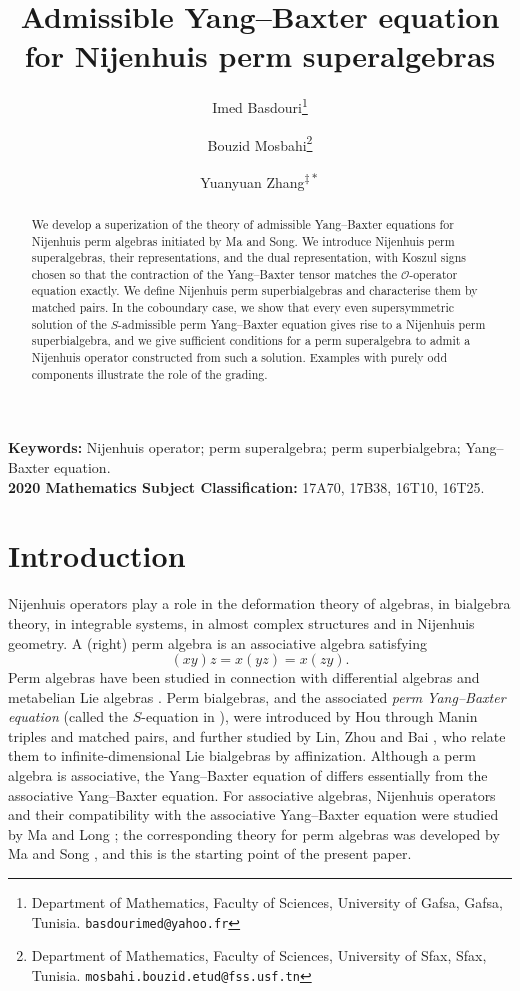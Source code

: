 \documentclass[11pt]{article}
\title{Admissible Yang--Baxter equation for Nijenhuis perm superalgebras}
\author{
Imed Basdouri\thanks{Department of Mathematics, Faculty of Sciences,
University of Gafsa, Gafsa, Tunisia.
\texttt{basdourimed@yahoo.fr}}
\and Bouzid Mosbahi\thanks{Department of Mathematics, Faculty of Sciences,
University of Sfax, Sfax, Tunisia.
\texttt{mosbahi.bouzid.etud@fss.usf.tn}}
\and Yuanyuan Zhang\textsuperscript{$\ddagger*$}
}
\date{}
\theoremstyle{definition}
\begin{document}
\maketitle

\begin{abstract}
We develop a superization of the theory of admissible Yang--Baxter equations for Nijenhuis perm algebras initiated by Ma and Song. We introduce Nijenhuis perm superalgebras, their representations, and the dual representation, with Koszul signs chosen so that the contraction of the Yang--Baxter tensor matches the $\mathcal O$-operator equation exactly. We define Nijenhuis perm superbialgebras and characterise them by matched pairs. In the coboundary case, we show that every even supersymmetric solution of the $S$-admissible perm Yang--Baxter equation gives rise to a Nijenhuis perm superbialgebra, and we give sufficient conditions for a perm superalgebra to admit a Nijenhuis operator constructed from such a solution. Examples with purely odd components illustrate the role of the grading.
\end{abstract}

\noindent\textbf{Keywords:} Nijenhuis operator; perm superalgebra; perm superbialgebra; Yang--Baxter equation.\\
\textbf{2020 Mathematics Subject Classification:} 17A70, 17B38, 16T10, 16T25.

\section{Introduction}

Nijenhuis operators play a role in the deformation theory of algebras, in bialgebra theory, in integrable systems, in almost complex structures and in Nijenhuis geometry. A (right) perm algebra is an associative algebra satisfying
\[
(xy)z=x(yz)=x(zy).
\]
Perm algebras have been studied in connection with differential algebras and metabelian Lie algebras \cite{KS,MaSa}. Perm bialgebras, and the associated \emph{perm Yang--Baxter equation} (called the $S$-equation in \cite{Hou}), were introduced by Hou \cite{Hou} through Manin triples and matched pairs, and further studied by Lin, Zhou and Bai \cite{LZB}, who relate them to infinite-dimensional Lie bialgebras by affinization. Although a perm algebra is associative, the Yang--Baxter equation of \cite{Hou,LZB} differs essentially from the associative Yang--Baxter equation. For associative algebras, Nijenhuis operators and their compatibility with the associative Yang--Baxter equation were studied by Ma and Long \cite{ML}; the corresponding theory for perm algebras was developed by Ma and Song \cite{MS}, and this is the starting point of the present paper.
\end{document}
